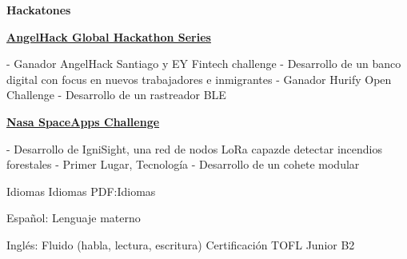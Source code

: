\documentclass[letterpaper,yyyy,draft]{simpleresumecv}
\begin{document}
\begin{Body}
{    \Gap
    \Entry
    \textbf{Hackatones}
    {
        {
            \BulletItem
            \href{https://angelhack.com}{\textbf{AngelHack Global Hackathon Series}}
            \hfill
            \begin{Detail}
            \Gap
             - Ganador AngelHack Santiago y EY Fintech challenge - \newline Desarrollo de un banco digital con focus en nuevos trabajadores e inmigrantes
            \Gap
             - Ganador Hurify Open Challenge - Desarrollo de un rastreador BLE
            \end{Detail}
        }
        {
            \Gap
            \BulletItem
            \href{https://spaceappschallenge.org}{\textbf{Nasa SpaceApps Challenge}}
            \hfill
            \begin{Detail}
            \Gap
             - Desarrollo de IgniSight, una red de nodos LoRa capaz\newline de detectar incendios forestales
            \Gap
             - Primer Lugar, Tecnología - Desarrollo de un cohete modular
            \end{Detail}
        }
    }
}


\Section
{Idiomas}
{Idiomas}
{PDF:Idiomas}
{
    {
        \BulletItem
        Español: Lenguaje materno
    }

    \Gap

    {
        \BulletItem
        Inglés: Fluido (habla, lectura, escritura)
        \SubBulletItem
        Certificación TOFL Junior B2
    }
}
\end{Body}
\end{document}
